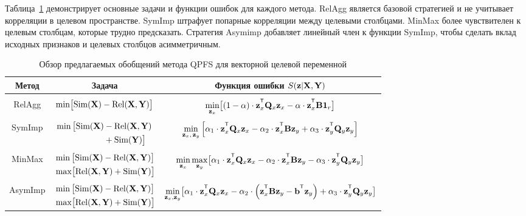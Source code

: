 \documentclass[11pt, a5paper]{dissert}
\begin{document}
Таблица~\ref{ch3:tbl:summary} демонстрирует основные задачи и функции ошибок для каждого метода. 
RelAgg является базовой стратегией и не учитывает корреляции в целевом пространстве.
SymImp штрафует попарные корреляции между целевыми столбцами.
MinMax более чувствителен к целевым столбцам, которые трудно предсказать.
Стратегия Asymimp добавляет линейный член к функции SymImp, чтобы сделать вклад исходных признаков и целевых столбцов асимметричным.

\begin{table}[ht]
	\centering
	\caption{Обзор предлагаемых обобщений метода QPFS для векторной целевой переменной}
	\small{
		\begin{tabular}{c|c|c}
			\hline
			Метод & Задача & Функция ошибки $S(\mathbf{z} | \mathbf{X}, \mathbf{Y})$ \\
			\hline && \\ [-.5em]
			RelAgg & $\min \bigl[ \text{Sim}(\mathbf{X}) - \text{Rel}(\mathbf{X}, \mathbf{Y}) \bigr] $ & $\min\limits_{\bz_x} \bigl[ (1 - \alpha) \cdot \bz_x^{\T} \bQ_x \bz_x - \alpha \cdot \bz_x^{\T} \bB \bOne_r \bigr] $ \\ &&\\[-.5em]
			SymImp & $\begin{aligned} \min \, \bigl[ \text{Sim}(\mathbf{X}) & - \text{Rel}(\mathbf{X}, \mathbf{Y}) \\ & + \text{Sim}(\mathbf{Y}) \bigr] \end{aligned}$ & $ \min\limits_{\bz_x, \, \bz_y} \left[ \alpha_1 \cdot \bz_x^{\T} \bQ_x \bz_x - \alpha_2 \cdot \bz_x^{\T} \bB \bz_y + \alpha_3 \cdot \bz_y^{\T} \bQ_y \bz_y \right] $\\ &&\\ [-.5em]
			MinMax & $\begin{aligned} &\min \, \bigl[ \text{Sim}(\mathbf{X}) - \text{Rel}(\mathbf{X}, \mathbf{Y}) \bigr]  \\ & \max \bigl[\text{Rel}(\mathbf{X}, \mathbf{Y}) + \text{Sim}(\mathbf{Y}) \bigr] \end{aligned}$ & $	\min\limits_{\bz_x} 	\max\limits_{\bz_y} \bigl[\alpha_1 \cdot \bz_x^{\T} \bQ_x \bz_x - \alpha_2 \cdot \bz_x^{\T} \bB \bz_y - \alpha_3 \cdot \bz_y^{\T} \bQ_y \bz_y \bigr]$ \\ &&\\ [-.5em]
			AsymImp & $\begin{aligned} & \min \, \bigl[ \text{Sim}(\mathbf{X}) - \text{Rel}(\mathbf{X}, \mathbf{Y}) \bigr]\\ &  \max \bigl[\text{Rel}(\mathbf{X}, \mathbf{Y}) + \text{Sim}(\mathbf{Y}) \bigr] \end{aligned}$ & $\min\limits_{\bz_x, \bz_y} \bigl[ \alpha_1 \cdot \bz_x^{\T} \bQ_x \bz_x - \alpha_2 \cdot \left(\bz_x^{\T} \bB \bz_y - \bb^{\T} \bz_y \right) + \alpha_3 \cdot \bz_y^{\T} \bQ_y \bz_y \bigr]$\\ 
			\hline
	\end{tabular}}
	\label{ch3:tbl:summary}
\end{table}
\end{document}
